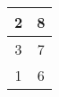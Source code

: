 \begin{table}[H]
\begin{tabular}{cc}
\multicolumn{1}{|c|}{2}                                                        & \multicolumn{1}{c|}{8}                                                             \\ \hline
\multicolumn{1}{|c|}{3}                                                        & \multicolumn{1}{c|}{7}                                                             \\ \hline
\multicolumn{1}{|c|}{1}                                                        & \multicolumn{1}{c|}{6}                                                             \\ \hline
\end{tabular}\end{table}